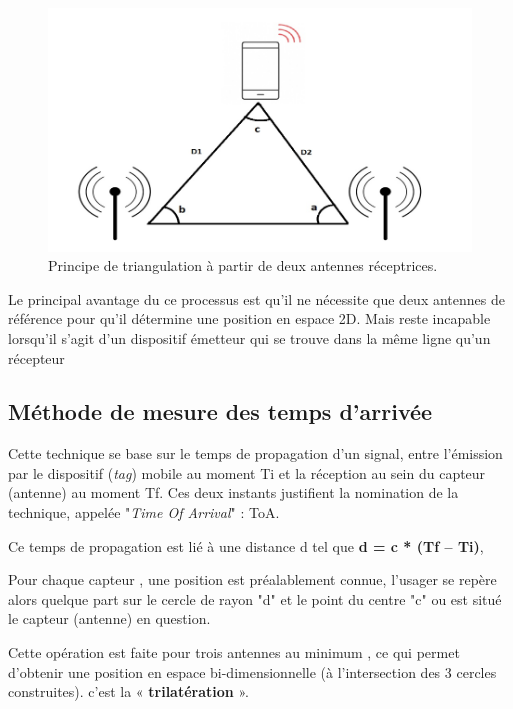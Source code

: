 \documentclass[12pt,a4paper]{report}
\begin{document}
\begin{figure}[H]
	\centering
	\includegraphics[width=0.9\linewidth]{Pics/triangulation.PNG}
	\caption{Principe de triangulation à partir de deux antennes réceptrices.}
	\label{fig:triangulation}
	
\end{figure}


Le principal avantage du ce processus est qu’il ne nécessite que deux antennes de référence pour qu'il détermine une position en espace 2D. Mais reste incapable lorsqu'il s'agit d'un dispositif émetteur qui se trouve dans la même ligne qu'un récepteur 


\subsection{Méthode de mesure des temps d’arrivée }

Cette technique se base sur le temps de propagation d’un signal, entre l’émission par le dispositif (\textit{tag}) mobile au moment Ti et la réception au sein du capteur (antenne) au moment Tf. Ces deux instants justifient la nomination de la technique, appelée  "\textit{Time Of Arrival}" : ToA.

Ce temps de propagation est lié à une distance d tel que \textbf{d = c * (Tf – Ti)},

 Pour chaque capteur , une position est préalablement connue, l’usager se repère alors quelque part sur le cercle de rayon "d" et le point du centre "c" ou est situé le capteur (antenne) en question.
 
 Cette opération est faite pour trois antennes au minimum , ce qui permet d’obtenir une position en espace bi-dimensionnelle (à l’intersection des 3 cercles construites). c'est la  « \textbf{trilatération} ».
\end{document}
